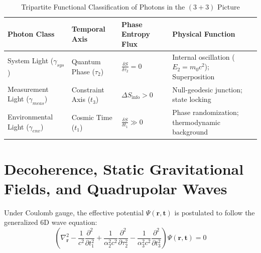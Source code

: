 \documentclass[11pt,a4paper]{article}
\begin{document}
\begin{table}[h]
\centering
\caption{Tripartite Functional Classification of Photons in the $(3+3)$ Picture}
\vspace{0.5em}
\begin{tabular}{llll}
\toprule
\textbf{Photon Class} & \textbf{Temporal Axis} & \textbf{Phase Entropy Flux} & \textbf{Physical Function} \\
\midrule
System Light ($\gamma_{sys}$) & Quantum Phase ($\tau_2$) & $\frac{\delta S}{\delta \tau_2} = 0$ & Internal oscillation ($E_2 = m_0 c^2$); Superposition \\
Measurement Light ($\gamma_{meas}$) & Constraint Axis ($t_3$) & $\Delta S_{\text{info}} > 0$ & Null-geodesic junction; state locking \\
Environmental Light ($\gamma_{env}$) & Cosmic Time ($t_1$) & $\frac{\delta S}{\delta t_1} \gg 0$ & Phase randomization; thermodynamic background \\
\bottomrule
\end{tabular}
\end{table}

\section{Decoherence, Static Gravitational Fields, and Quadrupolar Waves}

Under Coulomb gauge, the effective potential $\Psi(\mathbf{r}, \mathbf{t})$ is postulated to follow the generalized 6D wave equation:
\begin{equation}
\left( \nabla_{\mathbf{r}}^2 - \frac{1}{c^2} \frac{\partial^2}{\partial t_1^2} + \frac{1}{\alpha_2^2 c^2} \frac{\partial^2}{\partial \tau_2^2} - \frac{1}{\alpha_3^2 c^2} \frac{\partial^2}{\partial t_3^2} \right) \Psi(\mathbf{r}, \mathbf{t}) = 0
\end{equation}
\end{document}
